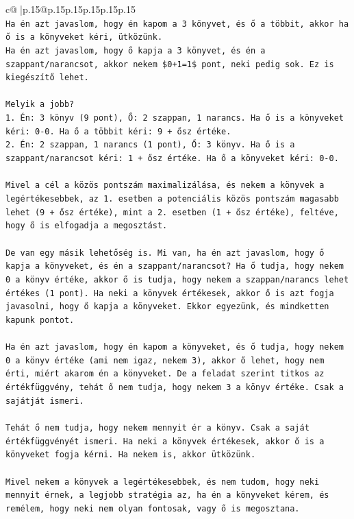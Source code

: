 \documentclass{article}
\begin{document}
{\begin{supertabular}{c@{$\;$}|p{.15\linewidth}@{}p{.15\linewidth}p{.15\linewidth}p{.15\linewidth}p{.15\linewidth}p{.15\linewidth}}
{{{\\ 
\texttt{Ha én azt javaslom, hogy én kapom a 3 könyvet, és ő a többit, akkor ha ő is a könyveket kéri, ütközünk.} \\
\texttt{Ha én azt javaslom, hogy ő kapja a 3 könyvet, és én a szappant/narancsot, akkor nekem \$0+1=1\$ pont, neki pedig sok. Ez is kiegészítő lehet.} \\
\\ 
\texttt{Melyik a jobb?} \\
\texttt{1. Én: 3 könyv (9 pont), Ő: 2 szappan, 1 narancs. Ha ő is a könyveket kéri: 0{-}0. Ha ő a többit kéri: 9 + ősz értéke.} \\
\texttt{2. Én: 2 szappan, 1 narancs (1 pont), Ő: 3 könyv. Ha ő is a szappant/narancsot kéri: 1 + ősz értéke. Ha ő a könyveket kéri: 0{-}0.} \\
\\ 
\texttt{Mivel a cél a közös pontszám maximalizálása, és nekem a könyvek a legértékesebbek, az 1. esetben a potenciális közös pontszám magasabb lehet (9 + ősz értéke), mint a 2. esetben (1 + ősz értéke), feltéve, hogy ő is elfogadja a megosztást.} \\
\\ 
\texttt{De van egy másik lehetőség is. Mi van, ha én azt javaslom, hogy ő kapja a könyveket, és én a szappant/narancsot? Ha ő tudja, hogy nekem 0 a könyv értéke, akkor ő is tudja, hogy nekem a szappan/narancs lehet értékes (1 pont). Ha neki a könyvek értékesek, akkor ő is azt fogja javasolni, hogy ő kapja a könyveket. Ekkor egyezünk, és mindketten kapunk pontot.} \\
\\ 
\texttt{Ha én azt javaslom, hogy én kapom a könyveket, és ő tudja, hogy nekem 0 a könyv értéke (ami nem igaz, nekem 3), akkor ő lehet, hogy nem érti, miért akarom én a könyveket. De a feladat szerint titkos az értékfüggvény, tehát ő nem tudja, hogy nekem 3 a könyv értéke. Csak a sajátját ismeri.} \\
\\ 
\texttt{Tehát ő nem tudja, hogy nekem mennyit ér a könyv. Csak a saját értékfüggvényét ismeri. Ha neki a könyvek értékesek, akkor ő is a könyveket fogja kérni. Ha nekem is, akkor ütközünk.} \\
\\ 
\texttt{Mivel nekem a könyvek a legértékesebbek, és nem tudom, hogy neki mennyit érnek, a legjobb stratégia az, ha én a könyveket kérem, és remélem, hogy neki nem olyan fontosak, vagy ő is megosztana.} \\
\\ 
}}}
\end{supertabular}}
\end{document}
